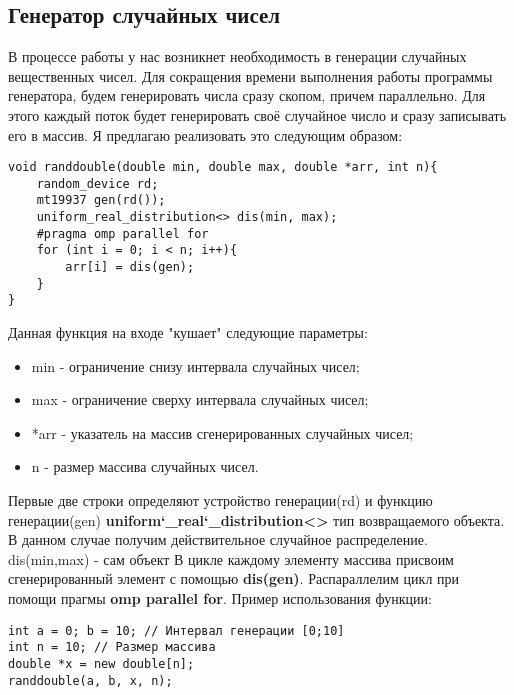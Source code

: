 \documentclass{article}
\begin{document}
\subsection{Генератор случайных чисел}
В процессе работы у нас возникнет необходимость в генерации случайных вещественных чисел. Для сокращения времени выполнения работы программы генератора, будем генерировать числа сразу скопом, причем параллельно. Для этого каждый поток будет генерировать своё случайное число и сразу записывать его в массив. Я предлагаю реализовать это следующим образом:
\begin{lstlisting}
void randdouble(double min, double max, double *arr, int n){
    random_device rd;
    mt19937 gen(rd());
    uniform_real_distribution<> dis(min, max);
    #pragma omp parallel for
    for (int i = 0; i < n; i++){
        arr[i] = dis(gen);
    }
}
\end{lstlisting}
Данная функция на входе "кушает" следующие параметры: 
\begin{itemize}
    \item min - ограничение снизу интервала случайных чисел;
    \item max - ограничение сверху интервала случайных чисел;
    \item *arr - указатель на массив сгенерированных случайных чисел;
    \item n - размер массива случайных чисел.
\end{itemize}
Первые две строки определяют устройство генерации(rd) и функцию генерации(gen)
\textbf{uniform\char`_real\char`_distribution<>} тип возвращаемого объекта. В данном случае
получим действительное случайное распределение. dis(min,max) - сам объект В цикле каждому элементу массива присвоим сгенерированный элемент с помощью \textbf{dis(gen)}. Распараллелим цикл при помощи прагмы \textbf{omp parallel for}.
Пример использования функции:

\begin{lstlisting}
int a = 0; b = 10; // Интервал генерации [0;10]
int n = 10; // Размер массива
double *x = new double[n];
randdouble(a, b, x, n);
\end{lstlisting}
\end{document}
